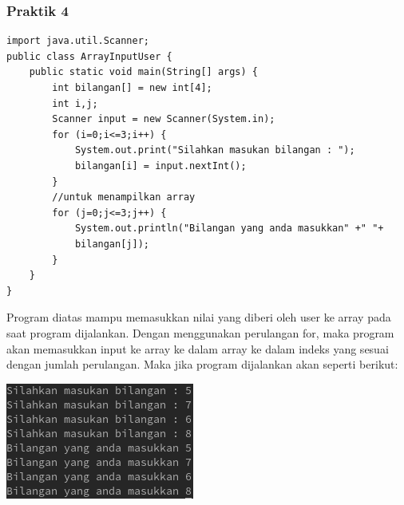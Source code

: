 \documentclass[a4paper,12pt]{article}
\begin{document}
\subsubsection{Praktik 4}
\begin{lstlisting}
import java.util.Scanner;
public class ArrayInputUser {
    public static void main(String[] args) {
        int bilangan[] = new int[4];
        int i,j;
        Scanner input = new Scanner(System.in);
        for (i=0;i<=3;i++) {
            System.out.print("Silahkan masukan bilangan : ");
            bilangan[i] = input.nextInt();
        }
        //untuk menampilkan array
        for (j=0;j<=3;j++) {
            System.out.println("Bilangan yang anda masukkan" +" "+
            bilangan[j]);
        }
    }
}
\end{lstlisting}
Program diatas mampu memasukkan nilai yang diberi oleh user ke array pada saat program dijalankan. Dengan menggunakan perulangan for, maka program akan memasukkan input ke array ke 
dalam array ke dalam indeks yang sesuai dengan jumlah perulangan. Maka jika program dijalankan akan seperti berikut:\\
\begin{center}
    \includegraphics[scale=.7]{3.png}
\end{center}

\newpage
\end{document}
